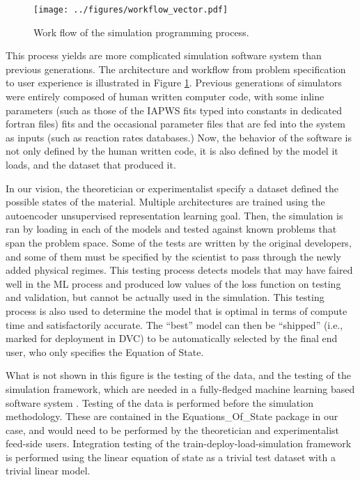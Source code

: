 \documentclass[AMA,STIX1COL]{WileyNJD-v2}
\begin{document}
\begin{figure}
  \centering
  \texttt{[image: ../figures/workflow\_vector.pdf]}
  \caption{\label{fig:workflow}Work flow of the simulation programming process.}
\end{figure}
This process yields are more complicated simulation software system
than previous generations. The architecture and workflow from problem
specification to user experience is illustrated in Figure
\ref{fig:workflow}.
Previous generations of simulators were entirely composed of human
written computer code, with some inline parameters (such as those of
the IAPWS fits typed into constants in dedicated fortran files)
fits and the occasional parameter files that are fed into the system
as inputs (such as reaction rates databases.)
Now, the behavior of the software is not only defined by the human
written code, it is also defined by the model it loads, and the
dataset that produced it.

In our vision, the theoretician or experimentalist specify a dataset
defined the possible states of the material. Multiple architectures
are trained using the autoencoder unsupervised representation learning
goal. Then, the simulation is ran by loading in each of the models and tested against known problems that
span the problem space. Some of the tests are written by the original
developers, and some of them must be specified by the scientist to
pass through the newly added physical regimes.
This testing process detects models that may have faired well in the
ML process and produced low values of the loss function on testing and
validation, but cannot be actually used in the simulation.
This testing process is also used to determine the model that is
optimal in terms of compute time and satisfactorily accurate.
The ``best'' model can then be ``shipped'' (i.e., marked for
deployment in DVC) to be automatically selected by the final end user,
who only specifies the Equation of State.

What is not shown in this figure is the testing of the data, and the
testing of the simulation framework, which are needed in a
fully-fledged machine learning based software system \cite{google ML smells}.
Testing of the data is performed before the simulation
methodology. These are contained in the Equations\_Of\_State package in our case, and would
need to be performed by the theoretician and experimentalist feed-side
users.
Integration testing of the train-deploy-load-simulation framework is
performed using the linear equation of state as a trivial test dataset
with a trivial linear model. 
\end{document}
